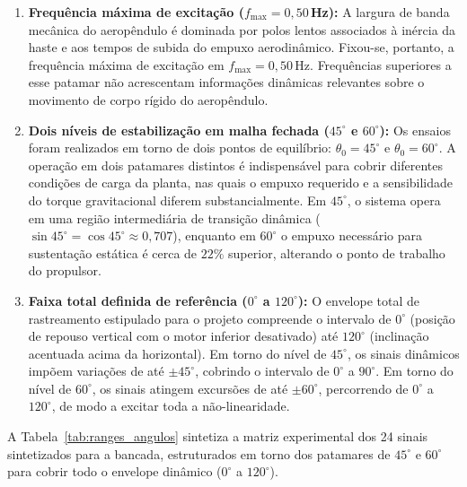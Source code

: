 \begin{enumerate}
    \item \textbf{Frequência máxima de excitação ($f_{\max} = 0{,}50$\,Hz):} A largura de banda mecânica do aeropêndulo é dominada por polos lentos associados à inércia da haste e aos tempos de subida do empuxo aerodinâmico. Fixou-se, portanto, a frequência máxima de excitação em $f_{\max} = 0{,}50$\,Hz. Frequências superiores a esse patamar não acrescentam informações dinâmicas relevantes sobre o movimento de corpo rígido do aeropêndulo.
    
     \item \textbf{Dois níveis de estabilização em malha fechada ($45^\circ$ e $60^\circ$):} Os ensaios foram realizados em torno de dois pontos de equilíbrio: $\theta_0 = 45^\circ$ e $\theta_0 = 60^\circ$. A operação em dois patamares distintos é indispensável para cobrir diferentes condições de carga da planta, nas quais o empuxo requerido e a sensibilidade do torque gravitacional diferem substancialmente. Em $45^\circ$, o sistema opera em uma região intermediária de transição dinâmica ($\sin 45^\circ = \cos 45^\circ \approx 0{,}707$), enquanto em $60^\circ$ o empuxo necessário para sustentação estática é cerca de $22\%$ superior, alterando o ponto de trabalho do propulsor.
    
    
    \item \textbf{Faixa total definida de referência ($0^\circ$ a $120^\circ$):} O envelope total de rastreamento estipulado para o projeto compreende o intervalo de $0^\circ$ (posição de repouso vertical com o motor inferior desativado) até $120^\circ$ (inclinação acentuada acima da horizontal). Em torno do nível de $45^\circ$, os sinais dinâmicos impõem variações de até $\pm 45^\circ$, cobrindo o intervalo de $0^\circ$ a $90^\circ$. Em torno do nível de $60^\circ$, os sinais atingem excursões de até $\pm 60^\circ$, percorrendo de $0^\circ$ a $120^\circ$, de modo a excitar toda a não-linearidade.
    
\end{enumerate}


A Tabela~\ref{tab:ranges_angulos} sintetiza a matriz experimental dos 24 sinais sintetizados para a bancada, estruturados em torno dos patamares de $45^\circ$ e $60^\circ$ para cobrir todo o envelope dinâmico ($0^\circ$ a $120^\circ$).

